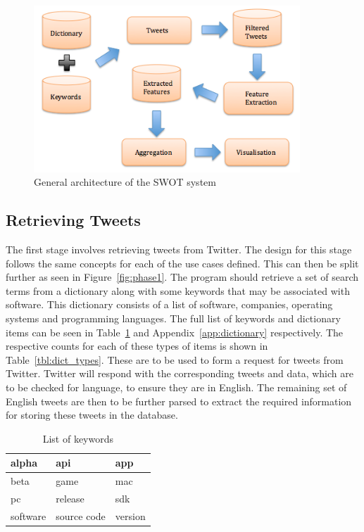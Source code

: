 \begin{figure}[h]
\begin{center}
\includegraphics[width=10cm]{design}
\end{center}
\caption{General architecture of the SWOT system}
\label{fig:general}
\end{figure}

\subsection{Retrieving Tweets}
\label{sec:arc1}
The first stage involves retrieving tweets from Twitter. The design for this stage follows the same concepts for each of the use cases defined. This can then be split further as seen in Figure~\ref{fig:phase1}. The program should retrieve a set of search terms from a dictionary along with some keywords that may be associated with software. This dictionary consists of a list of software, companies, operating systems and programming languages. The full list of keywords and dictionary items can be seen in Table~\ref{tbl:keywords} and Appendix~\ref{app:dictionary} respectively. The respective counts for each of these types of items is shown in Table~\ref{tbl:dict_types}.
These are to be used to form a request for tweets from Twitter. Twitter will respond with the corresponding tweets and data, which are to be checked for language, to ensure they are in English. The remaining set of English tweets are then to be further parsed to extract the required information for storing these tweets in the database.

\begin{table}[h]
\begin{center}
\begin{tabular}{|l|l|l|}\hline
alpha&api&app\\\hline
beta&game&mac\\\hline
pc&release&sdk\\\hline
software&source code&version\\\hline
\end{tabular}
\end{center}
\caption{List of keywords}
\label{tbl:keywords}
\end{table}

